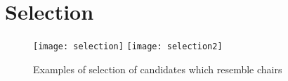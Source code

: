 \section{Selection}
\begin{figure}[h]
\texttt{[image: selection]}
\texttt{[image: selection2]}
\caption{Examples of selection of candidates which resemble chairs}
\label{fig:nasa_antenna}
\end{figure}
